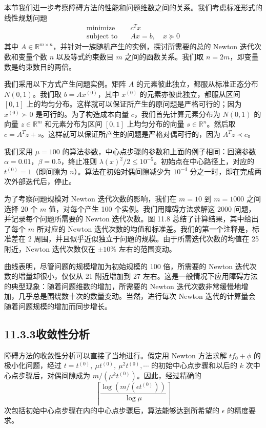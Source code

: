 \documentclass[UTF8, 12pt, fontset=fandol, oneside]{ctexart}
\begin{document}
本节我们进一步考察障碍方法的性能和问题维数之间的关系。我们考虑标准形式的线性规划问题
\[
\begin{aligned}
\text{minimize}\quad & c^Tx\\
\text{subject to}\quad & Ax=b,\quad x\succeq 0
\end{aligned}
\]
其中 $A\in\mathbb{R}^{m\times n}$，并针对一族随机产生的实例，探讨所需要的总的 Newton 迭代次数和变量个数 $n$ 以及等式约束数目 $m$ 之间的函数关系。我们取 $n=2m$，即变量数是约束数目的两倍。

我们采用以下方式产生问题实例。矩阵 $A$ 的元素彼此独立，都服从标准正态分布 $N(0,1)$。我们取 $b=Ax^{(0)}$，其中 $x^{(0)}$ 的元素亦彼此独立，都服从区间 $[0,1]$ 上的均匀分布。这样就可以保证所产生的原问题是严格可行的；因为 $x^{(0)}\succ 0$ 是可行的。为了构造成本向量 $c$，我们首先计算元素分布为 $N(0,1)$ 的向量 $z\in\mathbb{R}^m$ 和元素分布为区间 $[0,1]$ 上均匀分布的向量 $s\in\mathbb{R}^n$。然后取 $c=A^Tz+s$。这样就可以保证所产生的问题是严格对偶可行的，因为 $A^Tz\prec c$。

我们采用 $\mu=100$ 的算法参数，中心点步骤的参数和上面的例子相同：回溯参数 $\alpha=0.01$，$\beta=0.5$，终止准则 $\lambda(x)^2/2\leq 10^{-5}$。初始点在中心路径上，对应的 $t^{(0)}=1$（即间隙为 $n$）。算法在初始对偶间隙减少为 $10^{-4}$ 分之一时，即在完成两次外部迭代后，停止。

为了考察问题规模对 Newton 迭代次数的影响，我们在 $m=10$ 到 $m=1000$ 之间选择 20 个 $m$ 值，对每个产生 100 个实例。我们用障碍方法求解这 2000 问题，并记录每个问题所需要的 Newton 迭代次数。图 11.8 总结了计算结果，其中给出了每个 $m$ 所对应的 Newton 迭代次数的均值和标准差。我们的第一个注释是，标准差在 2 周围，并且似乎近似独立于问题的规模。由于所需迭代次数的均值在 25 附近，Newton 迭代次数仅在 $\pm 10\%$ 左右的范围变动。

曲线表明，尽管问题的规模增加为初始规模的 100 倍，所需要的 Newton 迭代次数的增量却很小，仅仅从 21 附近增加到 27 左右。这是一般情况下应用障碍方法的典型现象：随着问题维数的增加，所需要的 Newton 迭代次数非常缓慢地增加，几乎总是围绕数十次的数量变动。当然，进行每次 Newton 迭代的计算量会随着问题规模的增加而同步增长。

\subsection*{11.3.3\quad 收敛性分析}

障碍方法的收敛性分析可以直接了当地进行。假定用 Newton 方法求解 $tf_0+\phi$ 的极小化问题，经过 $t=t^{(0)},\ \mu t^{(0)},\ \mu^2t^{(0)},\cdots$ 的初始中心点步骤和以后的 $k$ 次中心点步骤后，对偶间隙成为 $m/(\mu^k t^{(0)})$。因此，经过精确的
\begin{equation}
\left\lceil \frac{\log(m/(\epsilon t^{(0)}))}{\log \mu}\right\rceil
\tag{11.13}
\end{equation}
次包括初始中心点步骤在内的中心点步骤后，算法能够达到所希望的 $\epsilon$ 的精度要求。
\end{document}
